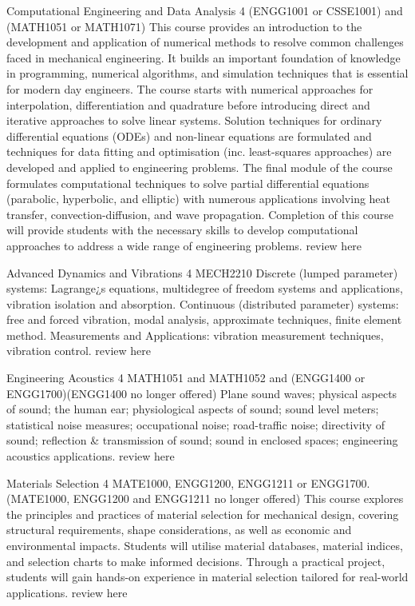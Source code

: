 {
	{Computational Engineering and Data Analysis}
	{4}
	{(ENGG1001 or CSSE1001) and (MATH1051 or MATH1071)}
	{}
	{}
	{This course provides an introduction to the development and application of numerical methods to resolve common challenges faced in mechanical engineering. It builds an important foundation of knowledge in programming, numerical algorithms, and simulation techniques that is essential for modern day engineers. The course starts with numerical approaches for interpolation, differentiation and quadrature before introducing direct and iterative approaches to solve linear systems. Solution techniques for ordinary differential equations (ODEs) and non-linear equations are formulated and techniques for data fitting and optimisation (inc. least-squares approaches) are developed and applied to engineering problems. The final module of the course formulates computational techniques to solve partial differential equations (parabolic, hyperbolic, and elliptic) with numerous applications involving heat transfer, convection-diffusion, and wave propagation. Completion of this course will provide students with the necessary skills to develop computational approaches to address a wide range of engineering problems.}
	{review here}

	{Advanced Dynamics and Vibrations}
	{4}
	{MECH2210}
	{}
	{}
	{Discrete (lumped parameter) systems: Lagrange¿s equations, multidegree of freedom systems and applications, vibration isolation and absorption. Continuous (distributed parameter) systems: free and forced vibration, modal analysis, approximate techniques, finite element method. Measurements and Applications: vibration measurement techniques, vibration control.}
	{review here}

	{Engineering Acoustics}
	{4}
	{MATH1051 and MATH1052 and (ENGG1400 or ENGG1700)(ENGG1400 no longer offered)}
	{}
	{}
	{Plane sound waves; physical aspects of sound; the human ear; physiological aspects of sound; sound level meters; statistical noise measures; occupational noise; road-traffic noise; directivity of sound; reflection & transmission of sound; sound in enclosed spaces; engineering acoustics applications.}
	{review here}

	{Materials Selection}
	{4}
	{MATE1000, ENGG1200, ENGG1211 or ENGG1700.(MATE1000, ENGG1200 and ENGG1211 no longer offered)}
	{}
	{}
	{This course explores the principles and practices of material selection for mechanical design, covering structural requirements, shape considerations, as well as economic and environmental impacts. Students will utilise material databases, material indices, and selection charts to make informed decisions. Through a practical project, students will gain hands-on experience in material selection tailored for real-world applications.}
	{review here}

}
